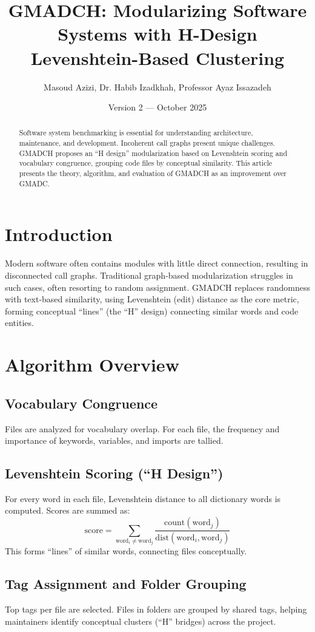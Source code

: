 \documentclass{article}
\title{GMADCH: Modularizing Software Systems with H-Design Levenshtein-Based Clustering}
\author{Masoud Azizi, Dr. Habib Izadkhah, Professor Ayaz Issazadeh}
\date{Version 2 — October 2025}
\begin{document}
\maketitle

\begin{abstract}
Software system benchmarking is essential for understanding architecture, maintenance, and development. Incoherent call graphs present unique challenges. GMADCH proposes an “H design” modularization based on Levenshtein scoring and vocabulary congruence, grouping code files by conceptual similarity. This article presents the theory, algorithm, and evaluation of GMADCH as an improvement over GMADC.
\end{abstract}

\section{Introduction}
Modern software often contains modules with little direct connection, resulting in disconnected call graphs. Traditional graph-based modularization struggles in such cases, often resorting to random assignment. GMADCH replaces randomness with text-based similarity, using Levenshtein (edit) distance as the core metric, forming conceptual “lines” (the “H” design) connecting similar words and code entities.

\section{Algorithm Overview}
\subsection{Vocabulary Congruence}
Files are analyzed for vocabulary overlap. For each file, the frequency and importance of keywords, variables, and imports are tallied.

\subsection{Levenshtein Scoring (“H Design”)}
For every word in each file, Levenshtein distance to all dictionary words is computed. Scores are summed as:
\[
\text{score} = \sum_{\text{word}_i \neq \text{word}_j} \frac{\text{count}(\text{word}_j)}{\text{dist}(\text{word}_i, \text{word}_j)}
\]
This forms “lines” of similar words, connecting files conceptually.

\subsection{Tag Assignment and Folder Grouping}
Top tags per file are selected. Files in folders are grouped by shared tags, helping maintainers identify conceptual clusters (“H” bridges) across the project.
\end{document}
